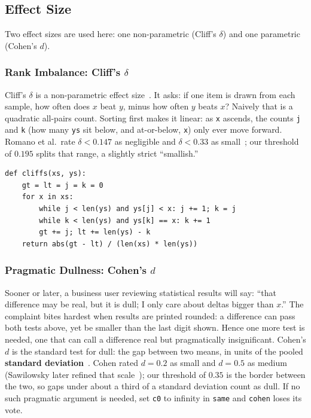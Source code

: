 \subsection{Effect Size}

Two effect sizes are used here: one non-parametric
(Cliff's $\delta$) and one parametric (Cohen's $d$).

\subsubsection{Rank Imbalance: Cliff's $\delta$}

Cliff's $\delta$ is a non-parametric effect
size~\cite{cliff93}.
It asks: if one item is drawn from each sample, how often does
$x$ beat $y$, minus how often $y$ beats $x$?
Naively that is a quadratic all-pairs count.
Sorting first makes it linear: as \texttt{x} ascends, the
counts \texttt{j} and \texttt{k} (how many \texttt{ys} sit
below, and at-or-below, \texttt{x}) only ever move forward.
Romano et al.\ rate $\delta<0.147$ as negligible and
$\delta<0.33$ as small~\cite{romano06}; our threshold of
$0.195$ splits that range, a slightly strict ``smallish.''

\begin{lstlisting}[style=py]
def cliffs(xs, ys):
    gt = lt = j = k = 0
    for x in xs:
        while j < len(ys) and ys[j] < x: j += 1; k = j
        while k < len(ys) and ys[k] == x: k += 1
        gt += j; lt += len(ys) - k
    return abs(gt - lt) / (len(xs) * len(ys))
\end{lstlisting}

\subsubsection{Pragmatic Dullness: Cohen's $d$}

Sooner or later, a business user reviewing statistical results
will say: ``that difference may be real, but it is dull; I only
care about deltas bigger than $x$.''
The complaint bites hardest when results are printed rounded: a
difference can pass both tests above, yet be smaller than the
last digit shown.
Hence one more test is needed, one that can call a difference
real but pragmatically insignificant.
Cohen's $d$ is the standard test for dull: the gap between two
means, in units of the pooled \textbf{standard
deviation}~\cite{cohen88}.
Cohen rated $d\!=\!0.2$ as small and $d\!=\!0.5$ as
medium~\cite{cohen88} (Sawilowsky later refined that
scale~\cite{sawilowsky09}); our threshold of $0.35$ is the
border between the two, so gaps under about a third of a
standard deviation count as dull.
If no such pragmatic argument is needed, set \texttt{c0} to
infinity in \texttt{same} and \texttt{cohen} loses its vote.

